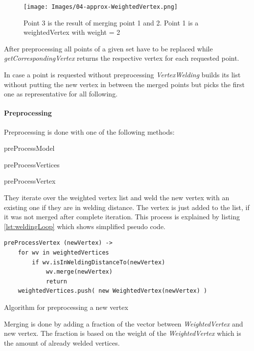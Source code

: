 \documentclass[../ClassicThesis.tex]{subfiles}
\begin{document}
\begin{figure}
\texttt{[image: Images/04-approx-WeightedVertex.png]}
\caption{Point 3 is the result of merging point 1 and 2. Point 1 is a weightedVertex with weight = 2}
\label{fig:weightedVertex}
\end{figure}

After preprocessing all points of a given set have to be replaced while \emph{getCorrespondingVertex} returns the respective vertex for each requested point. 

In case a point is requested without preprocessing \emph{VertexWelding} builds its list without putting the new vertex in between the merged points but picks the first one as representative for all following.




\paragraph{Preprocessing}

Preprocessing is done with one of the following methods:

\begin{description}
    \item preProcessModel
    \item preProcessVertices
    \item preProcessVertex
\end{description}

They iterate over the weighted vertex list and weld the new vertex with an existing one if they are in welding distance. The vertex is just added to the list, if it was not merged after complete iteration. This process is explained by listing \ref{lst:weldingLoop} which shows simplified pseudo code.

\begin{listing}[!h]
\centering
\begin{verbatim}
preProcessVertex (newVertex) ->
    for wv in weightedVertices
        if wv.isInWeldingDistanceTo(newVertex)
            wv.merge(newVertex)
            return
    weightedVertices.push( new WeightedVertex(newVertex) )
\end{verbatim}
\caption{Algorithm for preprocessing a new vertex}
\label{lst:weldingLoop}
\end{listing}

Merging is done by adding a fraction of the vector between \emph{WeightedVertex} and new vertex. The fraction is based on the weight of the \emph{WeightedVertex} which is the amount of already welded vertices.
\end{document}
